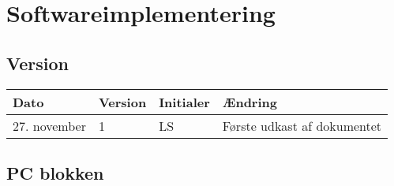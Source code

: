 \chapter{Softwareimplementering}

\section{Version}
\begin{table}[h]
	\centering
	\begin{tabularx}{\textwidth - 2cm}{|l|l| l|X|}
	\hline
	Dato	& Version	& Initialer & Ændring	\\ \hline
	27. november & 1 & LS	& Første udkast af dokumentet \\ \hline
	\end{tabularx}
\end{table}


\section{PC blokken}





\clearpage




\clearpage

